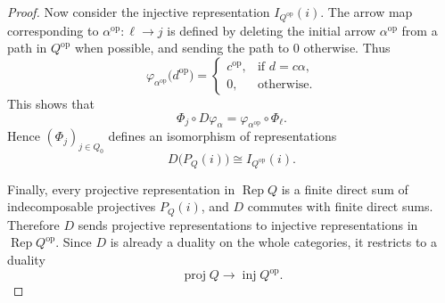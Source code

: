 \documentclass[11pt, a4paper]{report}
\begin{document}
\begin{proof}
        Now consider the injective representation \(I_{Q^{\operatorname{op}}}(i)\). The arrow map
        corresponding to \(\alpha^{\operatorname{op}}:\ell\to j\) is defined by deleting the initial arrow
        \(\alpha^{\operatorname{op}}\) from a path in \(Q^{\operatorname{op}}\) when possible, and sending the
        path to \(0\) otherwise. Thus
        \[
        \varphi_{\alpha^{\operatorname{op}}}\bigl(d^{\operatorname{op}}\bigr)
        =
        \begin{cases}
        c^{\operatorname{op}}, & \text{if } d=c\alpha,\\[1mm]
        0, & \text{otherwise.}
        \end{cases}
        \]
        This shows that
        \[
        \Phi_j\circ D\varphi_\alpha
        =
        \varphi_{\alpha^{\operatorname{op}}}\circ \Phi_\ell.
        \]
        Hence \((\Phi_j)_{j\in Q_0}\) defines an isomorphism of representations
        \[
        D\bigl(P_Q(i)\bigr)\cong I_{Q^{\operatorname{op}}}(i).
        \]

        Finally, every projective representation in \(\operatorname{Rep}Q\) is a finite direct sum of
        indecomposable projectives \(P_Q(i)\), and \(D\) commutes with finite direct sums. Therefore
        \(D\) sends projective representations to injective representations in
        \(\operatorname{Rep}Q^{\operatorname{op}}\). Since \(D\) is already a duality on the whole
        categories, it restricts to a duality
        \[
        \operatorname{proj}Q\longrightarrow \operatorname{inj}Q^{\operatorname{op}}.
        \]
        \end{proof}
\end{document}
